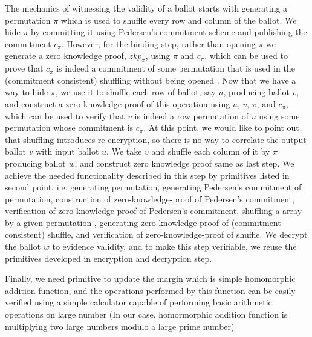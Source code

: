 \documentclass{llncs}
\begin{document}
The mechanics of witnessing the validity of a ballot starts with generating a 
permutation $\pi$ which is used to shuffle every row and column of the ballot.
We hide $\pi$ by committing it using Pedersen's 
commitment scheme 
and publishing  the commitment $c_{\pi}$. However, for the binding step, rather 
than opening $\pi$ we generate a zero knowledge proof, $zkp_{\pi}$, 
using $\pi$ and $c_{\pi}$, which can 
be  used to prove that $c_{\pi}$ is indeed a commitment of some permutation
that is used in the (commitment consistent) shuffling 
 without being opened \cite{Wikstrom:2009:CPS}. Now that we have a way 
 to hide $\pi$, we use it to shuffle each row of 
ballot, say $u$, producing ballot $v$, and construct a zero knowledge proof 
of this operation using $u$, $v$, $\pi$, and $c_{\pi}$, which can be used 
to verify that $v$ is indeed a row permutation of $u$ using some permutation 
whose commitment is $c_{\pi}$. At this point, we would like to point 
out that shuffling 
introduces re-encryption, so there is no way to correlate the output
ballot $v$ with input ballot $u$.  We take $v$ and shuffle each column of it 
by $\pi$ producing ballot $w$, and construct zero knowledge proof same 
as last step. We achieve the needed functionality described in this step
by primitives listed in second point, i.e. 
generating permutation, generating  Pedersen's 
commitment \cite{Pederson} of permutation, construction of 
zero-knowledge-proof of Pedersen's commitment, verification of 
zero-knowledge-proof of Pedersen's commitment, shuffling a array 
by a given permutation \cite{Wikstrom:2009:CPS}, 
generating zero-knowledge-proof of (commitment consistent) shuffle, 
and verification of zero-knowledge-proof of shuffle.
We decrypt the ballot $w$ to evidence validity, and to make this step
 verifiable, we reuse the primitives developed in
 encryption and decryption step.


Finally, we need primitive to update the margin which is simple homomorphic
addition function, and the operations performed by this function 
 can be easily verified using a simple calculator capable of performing 
 basic arithmetic operations on large number (In our case, homormorphic 
 addition function is multiplying two large numbers modulo a large prime 
 number)
\end{document}

